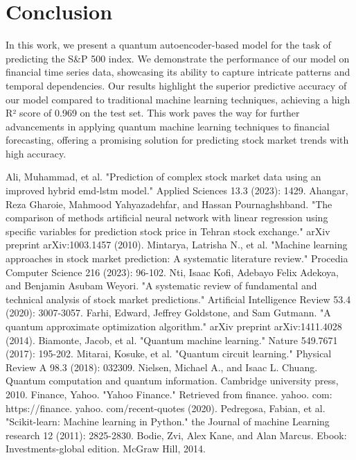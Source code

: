 \documentclass[conference]{IEEEtran}
\begin{document}
\section{Conclusion}
In this work, we present a quantum autoencoder-based model for the task of predicting the S\&P 500 index. We demonstrate the performance of our model on financial time series data, showcasing its ability to capture intricate patterns and temporal dependencies. Our results highlight the superior predictive accuracy of our model compared to traditional machine learning techniques, achieving a high R² score of 0.969 on the test set. This work paves the way for further advancements in applying quantum machine learning techniques to financial forecasting, offering a promising solution for predicting stock market trends with high accuracy.
\begin{thebibliography}{00}
 Ali, Muhammad, et al. "Prediction of complex stock market data using an improved hybrid emd-lstm model." Applied Sciences 13.3 (2023): 1429.
 Ahangar, Reza Gharoie, Mahmood Yahyazadehfar, and Hassan Pournaghshband. "The comparison of methods artificial neural network with linear regression using specific variables for prediction stock price in Tehran stock exchange." arXiv preprint arXiv:1003.1457 (2010).
 Mintarya, Latrisha N., et al. "Machine learning approaches in stock market prediction: A systematic literature review." Procedia Computer Science 216 (2023): 96-102.
 Nti, Isaac Kofi, Adebayo Felix Adekoya, and Benjamin Asubam Weyori. "A systematic review of fundamental and technical analysis of stock market predictions." Artificial Intelligence Review 53.4 (2020): 3007-3057.
 Farhi, Edward, Jeffrey Goldstone, and Sam Gutmann. "A quantum approximate optimization algorithm." arXiv preprint arXiv:1411.4028 (2014).
 Biamonte, Jacob, et al. "Quantum machine learning." Nature 549.7671 (2017): 195-202.
 Mitarai, Kosuke, et al. "Quantum circuit learning." Physical Review A 98.3 (2018): 032309.
 Nielsen, Michael A., and Isaac L. Chuang. Quantum computation and quantum information. Cambridge university press, 2010.
 Finance, Yahoo. "Yahoo Finance." Retrieved from finance. yahoo. com: https://finance. yahoo. com/recent-quotes (2020).
 Pedregosa, Fabian, et al. "Scikit-learn: Machine learning in Python." the Journal of machine Learning research 12 (2011): 2825-2830.
 Bodie, Zvi, Alex Kane, and Alan Marcus. Ebook: Investments-global edition. McGraw Hill, 2014.

\end{thebibliography}
\end{document}

